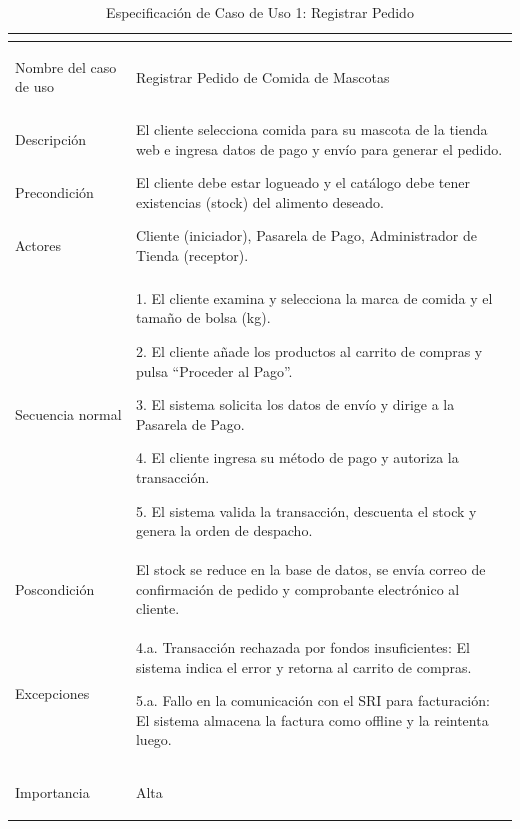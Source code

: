 \begin{table}[H]
    \centering
    \small
    \renewcommand{\arraystretch}{1.4}
    \begin{tabularx}{\textwidth}{|>{\bfseries\raggedright\arraybackslash}p{4cm}|L|}
        \hline
          \\
        \hline
        Nombre del caso de uso & Registrar Pedido de Comida de Mascotas \\
        \hline
        Descripción & El cliente selecciona comida para su mascota de la tienda web e ingresa datos de pago y envío para generar el pedido. \\
        \hline
        Precondición & El cliente debe estar logueado y el catálogo debe tener existencias (stock) del alimento deseado. \\
        \hline
        Actores & Cliente (iniciador), Pasarela de Pago, Administrador de Tienda (receptor). \\
        \hline
        Secuencia normal & 
        1. El cliente examina y selecciona la marca de comida y el tamaño de bolsa (kg). \par
        2. El cliente añade los productos al carrito de compras y pulsa ``Proceder al Pago''. \par
        3. El sistema solicita los datos de envío y dirige a la Pasarela de Pago. \par
        4. El cliente ingresa su método de pago y autoriza la transacción. \par
        5. El sistema valida la transacción, descuenta el stock y genera la orden de despacho. \\
        \hline
        Poscondición & El stock se reduce en la base de datos, se envía correo de confirmación de pedido y comprobante electrónico al cliente. \\
        \hline
        Excepciones & 
        4.a. Transacción rechazada por fondos insuficientes: El sistema indica el error y retorna al carrito de compras. \par
        5.a. Fallo en la comunicación con el SRI para facturación: El sistema almacena la factura como offline y la reintenta luego. \\
        \hline
        Importancia & Alta \\
        \hline
    \end{tabularx}
    \caption{Especificación de Caso de Uso 1: Registrar Pedido}
    \label{tab:especificacion_cu1}
\end{table}

